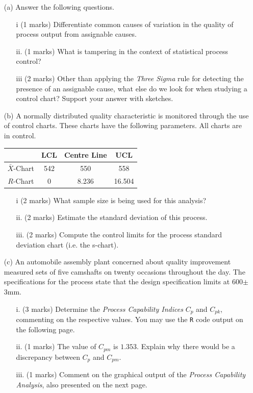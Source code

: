 \documentclass[a4paper,12pt]{article}
\begin{document}
\begin{itemize}
	\item[(a)] Answer the following questions.
	
	\begin{itemize}
		\item[i] (1 marks) Differentiate common causes of variation in the quality of process output from assignable causes.
		\item[ii.] (1 marks) What is tampering in the context of statistical process control?
		\item[iii] (2 marks) Other than applying the \emph{Three Sigma} rule for detecting the presence of an assignable cause, what else do we look for when studying a control chart? Support your answer with sketches.
	\end{itemize}
	
	\item[(b)] A normally distributed quality characteristic is monitored through the use of control charts. These charts have the following parameters. All charts are in control.
	\begin{center}
		\begin{tabular}{|c|c|c|c|}
			\hline  & LCL & Centre Line & UCL \\
			\hline $\bar{X}$-Chart & 542 & 550 & 558 \\
			\hline $R$-Chart & 0 & 8.236 & 16.504 \\ \hline
		\end{tabular}
	\end{center}
	
	\begin{itemize}
		\item[i] (2 marks) What sample size is being used for this analysis?
		\item[ii.] (2 marks) Estimate the standard deviation of this process.
		\item[iii.] (2 marks) Compute the control limits for the process standard deviation chart (i.e. the s-chart).
	\end{itemize}
	
	\item[(c)] An automobile assembly plant concerned about quality improvement measured sets of five camshafts on twenty occasions throughout the day. The specifications for the process state that the design specification limits at 600$\pm$3mm.
	
	
	\begin{itemize}
		\item[i.] (3 marks) Determine the \emph{Process Capability Indices} $C_p$ and $C_{pk}$, commenting on the respective values. You may use the \texttt{R} code output on the following page.
		\item[ii.] (1 marks)  The value of $C_{pm}$ is $1.353$. Explain why there would be a discrepancy between $C_p$ and $C_{pm}$.
		\item[iii.] (1 marks) Comment on the graphical output of the \emph{Process Capability Analysis}, also presented on the next page.
	\end{itemize}
	

\end{itemize}
\end{document}

